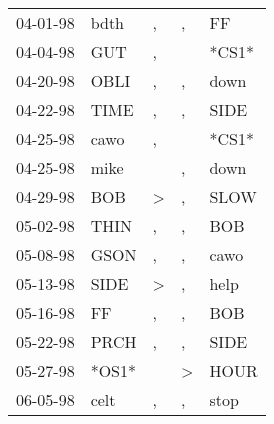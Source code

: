 \begin{supertabular}{p{0.07\textwidth}p{0.06\textwidth}p{0.02\textwidth}p{0.02\textwidth}p{0.06\textwidth}}
          04-01-98\textsuperscript{} &           bdth\textsuperscript{} &                , &                , &             FF\textsuperscript{} \\
          04-04-98\textsuperscript{} &            GUT\textsuperscript{} &                , &                  &                            *CS1* \\
          04-20-98\textsuperscript{} &           OBLI\textsuperscript{} &                , &                , &           down\textsuperscript{} \\
          04-22-98\textsuperscript{} &           TIME\textsuperscript{} &                , &                , &           SIDE\textsuperscript{} \\
          04-25-98\textsuperscript{} &           cawo\textsuperscript{} &                , &                  &                            *CS1* \\
          04-25-98\textsuperscript{} &           mike\textsuperscript{} &                  &                , &           down\textsuperscript{} \\
          04-29-98\textsuperscript{} &            BOB\textsuperscript{} &     \textgreater &                , &           SLOW\textsuperscript{} \\
          05-02-98\textsuperscript{} &           THIN\textsuperscript{} &                , &                , &            BOB\textsuperscript{} \\
          05-08-98\textsuperscript{} &           GSON\textsuperscript{} &                , &                , &           cawo\textsuperscript{} \\
          05-13-98\textsuperscript{} &           SIDE\textsuperscript{} &     \textgreater &                , &           help\textsuperscript{} \\
          05-16-98\textsuperscript{} &             FF\textsuperscript{} &                , &                , &            BOB\textsuperscript{} \\
          05-22-98\textsuperscript{} &           PRCH\textsuperscript{} &                , &                , &           SIDE\textsuperscript{} \\
          05-27-98\textsuperscript{} &                            *OS1* &                  &     \textgreater &           HOUR\textsuperscript{} \\
          06-05-98\textsuperscript{} &           celt\textsuperscript{} &                , &                , &           stop\textsuperscript{} \\

\end{supertabular}
